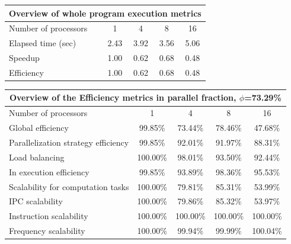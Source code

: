 \begin{tabular}{|l|c|c|c|c|}
\hline
\multicolumn{5}{|c|}{Overview of whole program execution metrics} \\
\hline
\hline
Number of processors & 1 & 4 & 8 & 16 \\
\hline
Elapsed time (sec)      &       2.43 &       3.92 &       3.56 &       5.06 \\
\hline
Speedup                 &       1.00 &       0.62 &       0.68 &       0.48 \\
\hline
Efficiency              &       1.00 &       0.62 &       0.68 &       0.48 \\
\hline
\end{tabular}
\vspace{2mm}
\begin{tabular}{|l|c|c|c|c|}
\hline
\multicolumn{5}{|c|}{Overview of the Efficiency metrics in parallel fraction, $\phi$=73.29\%} \\
\hline
\hline
Number of processors & 1 & 4 & 8 & 16 \\
\hline
\hline
Global efficiency                      &     99.85\% &     73.44\% &     78.46\% &     47.68\% \\
\hline
\hline
Parallelization strategy efficiency &     99.85\% &     92.01\% &     91.97\% &     88.31\% \\
\hline
Load balancing                   &    100.00\% &     98.01\% &     93.50\% &     92.44\% \\
In execution efficiency          &     99.85\% &     93.89\% &     98.36\% &     95.53\% \\
\hline
\hline
Scalability for computation tasks   &    100.00\% &     79.81\% &     85.31\% &     53.99\% \\
\hline
IPC scalability                  &    100.00\% &     79.86\% &     85.32\% &     53.97\% \\
Instruction scalability          &    100.00\% &    100.00\% &    100.00\% &    100.00\% \\
Frequency scalability            &    100.00\% &     99.94\% &     99.99\% &    100.04\% \\
\hline
\end{tabular}
\vspace{2mm}
